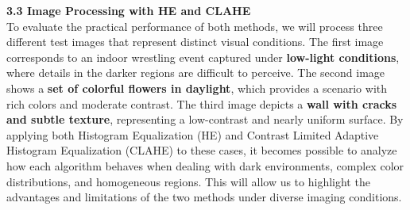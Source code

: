 \documentclass[11pt]{article}
\begin{document}
\textbf{3.3 Image Processing with HE and CLAHE}\\
To evaluate the practical performance of both methods, we will process
three different test images that represent distinct visual conditions.
The first image corresponds to an indoor wrestling event captured under
\textbf{low-light conditions}, where details in the darker regions are
difficult to perceive. The second image shows a \textbf{set of colorful
flowers in daylight}, which provides a scenario with rich colors and
moderate contrast. The third image depicts a \textbf{wall with cracks
and subtle texture}, representing a low-contrast and nearly uniform
surface. By applying both Histogram Equalization (HE) and Contrast
Limited Adaptive Histogram Equalization (CLAHE) to these cases, it
becomes possible to analyze how each algorithm behaves when dealing with
dark environments, complex color distributions, and homogeneous regions.
This will allow us to highlight the advantages and limitations of the
two methods under diverse imaging conditions.
\end{document}
